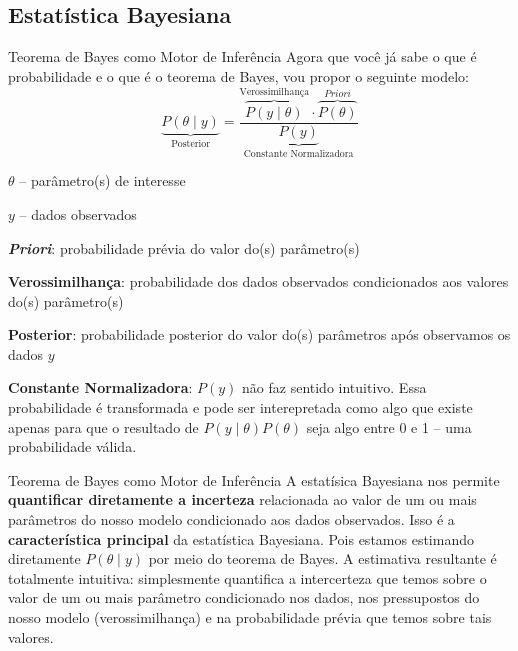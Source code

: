 \subsection{Estatística Bayesiana}
\begin{frame}{Teorema de Bayes como Motor de Inferência}
    \footnotesize Agora que você já sabe o que é probabilidade e o que é o teorema de Bayes, vou propor o seguinte modelo:
    $$
    \underbrace{P(\theta \mid y)}_{\text{Posterior}} = \frac{\overbrace{P(y \mid  \theta)}^{\text{Verossimilhança}} \cdot \overbrace{P(\theta)}^{\textit{Priori}}}{\underbrace{P(y)}_{\text{Constante Normalizadora}}}
    $$
    \begin{vfilleditems}
        \item \footnotesize $\theta$ -- parâmetro(s) de interesse
        \item \footnotesize $y$ -- dados observados
        \item \footnotesize \textbf{\textit{Priori}}: probabilidade prévia do valor do(s) parâmetro(s)
        \item \footnotesize \textbf{Verossimilhança}: probabilidade dos dados observados condicionados aos valores do(s) parâmetro(s)
        \item \footnotesize \textbf{Posterior}: probabilidade posterior do valor do(s) parâmetros após observamos os dados $y$
        \item \footnotesize \textbf{Constante Normalizadora}: $P(y)$ não faz sentido intuitivo. Essa probabilidade é transformada e pode ser interepretada como algo que existe apenas para que o resultado de $P(y \mid \theta) P(\theta)$ seja algo entre 0 e 1 -- uma probabilidade válida.
    \end{vfilleditems}
\end{frame}

\begin{frame}{Teorema de Bayes como Motor de Inferência}
    A estatísica Bayesiana nos permite \textbf{quantificar diretamente a incerteza}
    relacionada ao valor de um ou mais parâmetros do nosso modelo condicionado aos
    dados observados. Isso é a \textbf{característica principal} da estatística
    Bayesiana. Pois estamos estimando diretamente $P(\theta \mid y)$ por meio do
    teorema de Bayes. A estimativa resultante é totalmente intuitiva:
    simplesmente quantifica a intercerteza que temos sobre o valor de um ou mais
    parâmetro condicionado nos dados, nos pressupostos do nosso modelo
    (verossimilhança) e na probabilidade prévia que temos sobre tais valores.
\end{frame}

